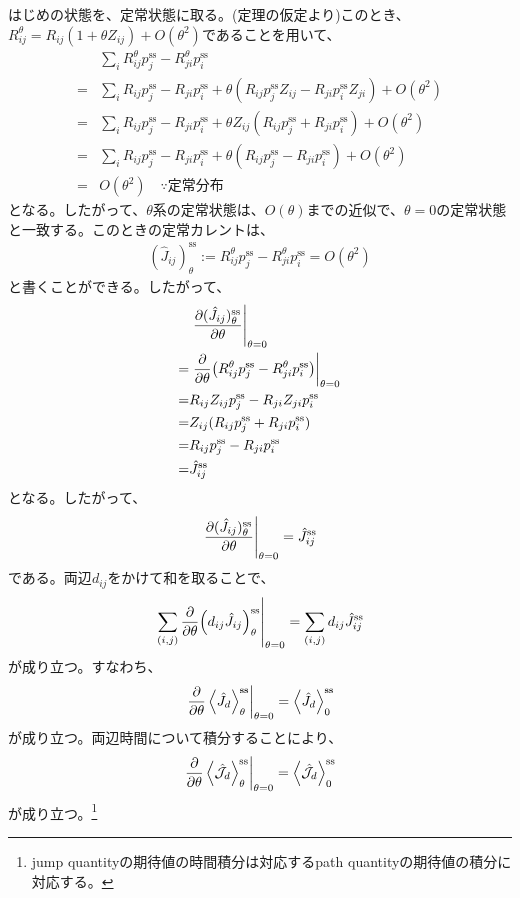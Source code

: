 \documentclass[a4paper,11pt]{jsarticle}
\numberwithin{equation}{section}
\begin{document}
はじめの状態を、定常状態に取る。(定理の仮定より)このとき、$R_{ij} ^{\theta} = R_{ij}(1+\theta Z_{ij}) + O(\theta^2)$であることを用いて、
\begin{align}
    &\sum_{i}R_{ij}^{\theta} p_j^\text{ss} - R_{ji}^{\theta} p_i^\text{ss} \\
    =& \sum_{i}R_{ij} p_j^\text{ss} - R_{ji} p_i^\text{ss} + \theta (R_{ij} p_j^\text{ss} Z_{ij} - R_{ji} p_i^\text{ss} Z_{ji}) + O(\theta^2)\\
    =& \sum_{i}R_{ij} p_j^\text{ss} - R_{ji} p_i^\text{ss} + \theta Z_{ij}(R_{ij} p_j^\text{ss} + R_{ji} p_i^\text{ss}) + O(\theta^2)\\
    =& \sum_{i}R_{ij} p_j^\text{ss} - R_{ji} p_i^\text{ss} + \theta  (R_{ij} p_j^\text{ss} - R_{ji} p_i^\text{ss}) + O(\theta^2)\\
    =& O(\theta^2) \quad \because \text{定常分布}
\end{align}
となる。したがって、$\theta$系の定常状態は、$O(\theta)$までの近似で、$\theta = 0$の定常状態と一致する。このときの定常カレントは、
\begin{align}
   (\hat{J}_{ij})_\theta^{\text{ss}}:= R_{ij}^\theta p_j^\text{ss} - R_{ji}^\theta p_i^\text{ss} = O(\theta^2)
\end{align}
と書くことができる。したがって、
\begin{align}
    &\eval{\pdv{({\hat{{J}}_{ij}})^{\text{ss}}_\theta}{\theta}}_{\theta = 0} \\
    =& \eval{\pdv{\theta} (R_{ij}^\theta p_j^\text{ss} - R_{ji}^\theta p_i^\text{ss})}_{\theta = 0} \\
    =&  R_{ij} Z_{ij} p_j^\text{ss} - R_{ji} Z_{ji} p_i^\text{ss} \\
    =&  Z_{ij} (R_{ij} p_j^\text{ss} + R_{ji} p_i^\text{ss}) \\
    =&  R_{ij}p_j^\text{ss} - R_{ji}p_i^\text{ss} \\
    =& \hat{J}_{ij}^\text{ss}
\end{align}
となる。したがって、
\begin{align}
    \eval{\pdv{({\hat{J}_{ij}})^{\text{ss}}_\theta}{\theta}}_{\theta = 0} = \hat{J}_{ij}^{\text{ss}}
\end{align}
である。両辺$d_{ij}$をかけて和を取ることで、
\begin{align}
    \left.\sum_{(i,j)} \pdv{\theta} ({d_{ij}\hat{J}_{ij}})^{\text{ss}}_\theta \right|_{\theta = 0} = \sum_{(i,j)} d_{ij} \hat{J}_{ij}^{\text{ss}}
\end{align}
が成り立つ。すなわち、
\begin{align}
    \left.\pdv{\theta} \ev{\hat{{J}}_{d}}^{\text{ss}}_\theta\right|_{\theta = 0} = \ev{\hat{{J}}_{d}}^{\text{ss}}_{0}
\end{align}
が成り立つ。両辺時間について積分することにより、
\begin{align}
    \left.\pdv{\theta} \ev{\hat{{\mathcal{J}}_{d}}}^{\text{ss}}_\theta\right|_{\theta = 0} = \ev{\hat{{\mathcal{J}}_{d}}}^{\text{ss}}_{0}
\end{align}
が成り立つ。\footnote{jump quantityの期待値の時間積分は対応するpath quantityの期待値の積分に対応する。}
\end{document}
